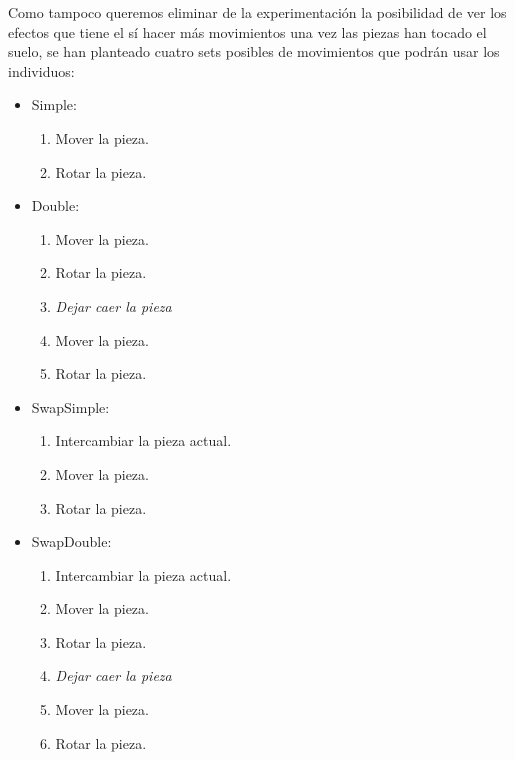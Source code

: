 \documentclass[11pt,spanish,listoffigures,listoftables]{tfgetsinf}
\begin{document}
Como tampoco queremos eliminar de la experimentación la posibilidad de ver los efectos que tiene el sí hacer más movimientos una vez las piezas han tocado el suelo, se han planteado cuatro sets posibles de movimientos que podrán usar los individuos:
\begin{itemize}
    \item Simple:
        \begin{enumerate}
            \item Mover la pieza.
            \item Rotar la pieza.
        \end{enumerate}

    \item Double:
        \begin{enumerate}
            \item Mover la pieza.
            \item Rotar la pieza.
            \item \textit{Dejar caer la pieza}
            \item Mover la pieza.
            \item Rotar la pieza.
        \end{enumerate}

    \item SwapSimple:
        \begin{enumerate}
            \item Intercambiar la pieza actual.
            \item Mover la pieza.
            \item Rotar la pieza.
        \end{enumerate}

    \item SwapDouble:
        \begin{enumerate}
            \item Intercambiar la pieza actual.
            \item Mover la pieza.
            \item Rotar la pieza.
            \item \textit{Dejar caer la pieza}
            \item Mover la pieza.
            \item Rotar la pieza.
        \end{enumerate}
\end{itemize}
    
\end{document}
